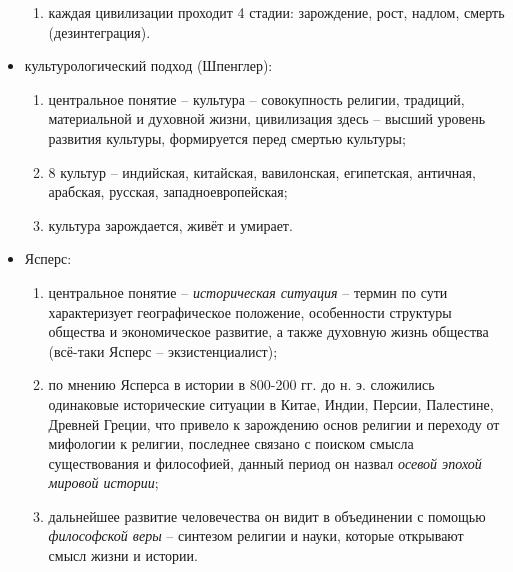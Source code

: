 \begin{itemize}
\begin{enumerate}
		\item каждая цивилизации проходит 4 стадии: зарождение, рост, надлом, смерть (дезинтеграция).
	\end{enumerate}
	\item культурологический подход (Шпенглер):
	\begin{enumerate}
		\item центральное понятие -- культура -- совокупность религии, традиций, материальной и духовной жизни, цивилизация здесь -- высший уровень развития культуры, формируется перед смертью культуры; 
		\item 8 культур --  индийская, китайская, вавилонская, египетская, античная, арабская, русская, западноевропейская;
		\item культура зарождается, живёт и умирает.
	\end{enumerate}
	\item Ясперс:
	\begin{enumerate}
		\item центральное понятие -- \textit{историческая ситуация} -- термин по сути характеризует географическое положение, особенности структуры общества и экономическое развитие, а также духовную жизнь общества (всё-таки Ясперс -- экзистенциалист); 
		\item по мнению Ясперса в истории в 800-200 гг. до н. э. сложились одинаковые исторические ситуации в Китае, Индии, Персии, Палестине, Древней Греции, что привело к зарождению основ религии и переходу от мифологии к религии, последнее связано с поиском смысла существования и философией, данный период он назвал \textit{осевой эпохой мировой истории};
		\item дальнейшее развитие человечества он видит в объединении с помощью \textit{философской веры} -- синтезом религии и науки, которые открывают смысл жизни и истории.
	\end{enumerate}
\end{itemize}

